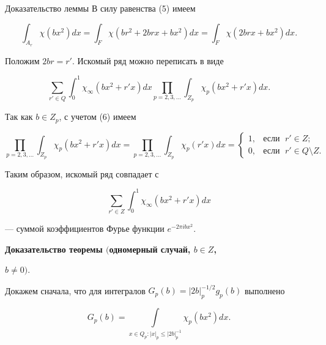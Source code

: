 \begin{pf*}{Доказательство леммы} В силу равенства (5) имеем 


$$ 


\int_{A_r}\chi(b x^2)d x=\int_F \chi(b r^2+2b r x+b x^2)d x= 


\int_F \chi(2b r x+b x^2)d x. 


$$ 


Положим $2b r=r'$. Искомый ряд можно переписать в виде 


$$ 


\sum_{r'\in Q}\int^1_0 \chi_\infty(b x^2+r' x)d x 


\prod_{p=2,3,\dotsc}\int_{Z_p} \chi_p(b x^2+r' x)d x. 


$$ 


Так как $b\in Z_p$, с учетом (6) имеем 


$$ 


\prod_{p=2,3,\dotsc}\int_{Z_p}\chi_p(b x^2+r' x)d x= 


\prod_{p=2,3,\dotsc}\int_{Z_p} \chi_p(r' x)d x= 


\begin{cases} 


1, & \text{если }\; r'\in Z;\\ 


0, & \text{если }\; r'\in Q\setminus Z. 


\end{cases} 


$$ 


Таким образом, искомый ряд совпадает с 


$$ 


\sum_{r'\in Z}\int^1_0 \chi_\infty 


(b x^2+r' x)d x 


$$ 


--- суммой коэффициентов Фурье функции $e^{-2\pi i b x^2}$. 


\end{pf*} 


 


{\bf Доказательство теоремы $($одномерный случай, $b\in Z$, 


$b\ne0)$.} Докажем сначала, что для интегралов $G_p(b)=|2b|^{-1/2}_p 


g_p(b)$ выполнено 


\begin{equation} 


G_p(b)=\int\limits_{x\in Q_p:|x|_p\le|2b|^{-1}_p} 


\chi_p(b x^2)d x. 


\end{equation} 


